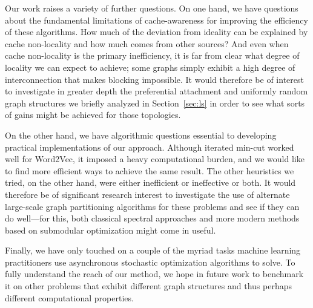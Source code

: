 \documentclass[times,11pt]{article}
\numberwithin{equation}{section}		%
\numberwithin{figure}{section}			%
\numberwithin{table}{section}				%
\begin{document}
Our work raises a variety of further questions. On one hand, we have questions about the fundamental limitations of cache-awareness for improving the efficiency of these algorithms.
How much of the deviation from ideality can be explained by cache non-locality and how much comes from other sources? And even when cache non-locality is the primary inefficiency,
it is far from clear what degree of locality we can expect to achieve; some graphs simply exhibit a high degree of interconnection that makes blocking impossible. It would therefore be of interest
to investigate in greater depth the preferential attachment and uniformly random graph structures we briefly analyzed in Section~\ref{sec:ls} in order to see what sorts of gains might be achieved for
those topologies.

On the other hand, we have algorithmic questions essential to developing practical implementations of our approach. Although iterated min-cut worked well for Word2Vec, it imposed a heavy computational burden, and we would like
to find more efficient ways to achieve the same result. The other heuristics we tried, on the other hand, were either inefficient or ineffective or both. It would therefore be of significant research interest to 
investigate the use of alternate large-scale graph partitioning algorithms for these problems and see if they can do well---for this, both classical spectral approaches and more modern methods based on submodular optimization
might come in useful.

Finally, we have only touched on a couple of the myriad tasks machine learning practitioners use asynchronous stochastic optimization algorithms to solve. To fully understand the reach of our method, we hope in future work to 
benchmark it on other problems that exhibit different graph structures and thus perhaps different computational properties.



\end{document}
